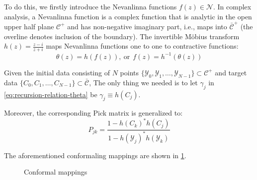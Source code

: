 \documentclass[
	preprint,%
	aps,
	prb,
	showpacs,	
	amsmath, amssymb]{revtex4-2}
\newcommand{\Y}{ {\mathcal{Y}} }
\newcommand{\C}{ {\mathcal{C}} }
\newcommand{\Cbar}{ {\bar{\mathcal{C}}} }
\newcommand{\D}{ {\mathcal{D}} }
\newcommand{\Dbar}{ {\bar{\mathcal{D}}} }
\newcommand{\B}{ {\mathcal{B}} }
\newcommand{\N}{ {\mathcal{N}} }
\begin{document}
To do this, we firstly introduce the Nevanlinna functions $f(z) \in \N$.
In complex analysis, a Nevanlinna function is a complex
function that is analytic in the open upper half plane $\C^+$ and
has non-negative imaginary part, i.e., maps into $\Cbar^+$ (the
overline denotes inclusion of the boundary).
The invertible Möbius transform $h(z) = \frac{z-i}{z+i}$ 
maps Nevanlinna functions one to one to contractive
functions:
\begin{equation}\label{eq:f-theta-relation}
	\theta(z) = h(f(z)),\ \mathrm{or} \ \
	f(z) = h^{-1}(\theta(z))
\end{equation}

Given the initial data consisting of $N$ points 
$\{\Y_0, \Y_1, \dots ,\Y_{N-1}\} \subset \C^+$ and target data
$\{C_0, C_1, \dots ,C_{N-1}\} \subset \Cbar$, 
The only thing we needed is to let $\gamma_j$ in 
\cref{eq:recursion-relation-theta} be $\gamma_j \equiv h(C_j)$.

Moreover, the corresponding Pick matrix is generalized to:
\begin{equation}\label{eq:pick-matrix-nevanlinna}
	P_{jk} = \frac{1-h(C_k)^* h(C_j)}{1 - h(\Y_j)^* h(\Y_k)}
\end{equation}

The aforementioned conformaling mappings are shown in \cref{fig:conformal-map}.
\begin{figure}[htbp]
	\centering
	\begin{minipage}[t]{0.7\linewidth}
		\centering
	\end{minipage}
	\caption{Conformal mappings}
	\label{fig:conformal-map}
\end{figure}
\end{document}
